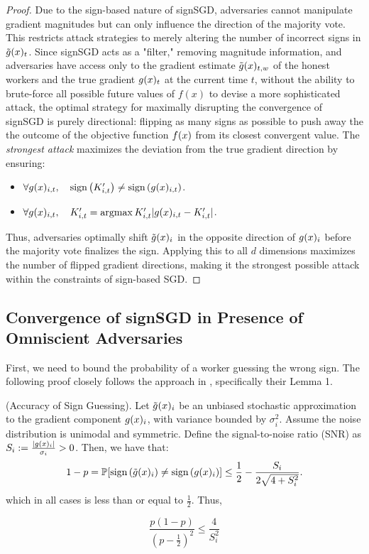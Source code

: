 \begin{proof}
Due to the sign-based nature of signSGD, adversaries cannot manipulate gradient magnitudes but can only influence the direction of the majority vote. This restricts attack strategies to merely altering the number of incorrect signs in $\tilde{g}(x)_t$. Since signSGD acts as a "filter," removing magnitude information, and adversaries have access only to the gradient estimate $\tilde{g}(x)_{t, w}$ of the honest workers and the true gradient $g(x)_t$ at the current time $t$, without the ability to brute-force all possible future values of $f(x)$ to devise a more sophisticated attack, the optimal strategy for maximally disrupting the convergence of signSGD is purely directional: flipping as many signs as possible to push away the the outcome of the objective function $f(x)$ from its closest convergent value.
The \emph{strongest attack} maximizes the deviation from the true gradient direction by ensuring: \begin{itemize} \item $\forall g(x)_{i,t}, \quad \textnormal{sign}\left(K'_{i,t}\right) \neq \textnormal{sign}\left(g(x)_{i,t}\right)$.
\item $\forall g(x)_{i,t}, \quad K'_{i,t} = \operatorname*{argmax}{K'_{i,t}} |g(x)_{i,t} - K'_{i,t}|$.
\end{itemize}
Thus, adversaries optimally shift $\tilde{g}(x)_i$ in the opposite direction of $g(x)_i$ before the majority vote finalizes the sign.
Applying this to all $d$ dimensions maximizes the number of flipped gradient directions, making it the strongest possible attack within the constraints of sign-based SGD.
\end{proof}


\subsection{Convergence of signSGD in Presence of Omniscient Adversaries}
First, we need to bound the probability of a worker guessing the wrong sign. The following proof closely follows the approach in \cite{bernstein2018signsgd}, specifically their Lemma 1.

\begin{lemma}
\textnormal{(Accuracy of Sign Guessing).}
\label{Lemma 1}
Let $\tilde{g}(x)_i$ be an unbiased stochastic approximation to the gradient component $g(x)_i$, with variance bounded by $\sigma^2_i$. Assume the noise distribution is unimodal and symmetric. Define the signal-to-noise ratio (SNR) as $S_i := \frac{|g(x)_i|}{\sigma_i} > 0$. Then, we have that:
\begin{equation*}
    1 - p = \mathbb{P}[\textnormal{sign}\left(\tilde{g}(x)_i\right) \neq \textnormal{sign}\left(g(x)_i\right)] \leq \frac{1}{2} - \frac{S_i}{2\sqrt{4 + S_i^2}}.
\end{equation*}
which in all cases is less than or equal to $\frac{1}{2}$. Thus,

\begin{equation*}
    \frac{p(1 - p)}{(p - \frac{1}{2})^2} \leq \frac{4}{S_i^2}
\end{equation*}
\end{lemma}

